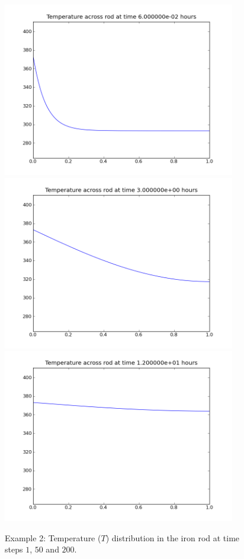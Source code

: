 \begin{figure}
\begin{center}
\includegraphics[width=4in]{figures/rodpyplot001}
\includegraphics[width=4in]{figures/rodpyplot050}
\includegraphics[width=4in]{figures/rodpyplot200}
\caption{Example 2: Temperature ($T$) distribution in the iron rod at time steps $1$, $50$ and $200$.}
\label{fig:onedheatout 002} 
\end{center}
\end{figure}

